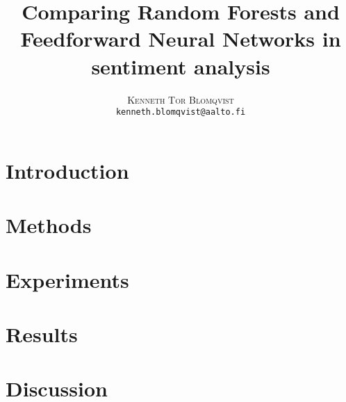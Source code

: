 \documentclass[twoside]{article}
\title{\vspace{-15mm}\fontsize{24pt}{10pt}\selectfont\textbf{Comparing Random Forests and Feedforward Neural Networks in sentiment analysis}}
\author{
  \large
  \textsc{Kenneth Tor Blomqvist}\\[2mm]
  \tt kenneth.blomqvist@aalto.fi \\[2mm]
}
\date{}
\begin{document}
\maketitle %


\begin{abstract}
  
\end{abstract}


\begin{multicols}{2} %

  \section{Introduction}
  \label{sec:introduction}
  

  \section{Methods}
  \label{sec:methods}
  

  \section{Experiments}
  \label{sec:experiments}
  

  \section{Results}
  \label{sec:results}
  

  \section{Discussion}
  \label{sec:discussion}
  



  
  

\end{multicols} %
\pagebreak
\end{document}
